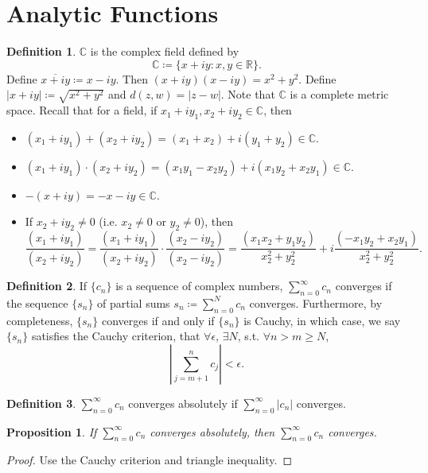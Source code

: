 \documentclass[12pt]{article}
\theoremstyle{plain}
\newtheorem*{prop}{Proposition}
\theoremstyle{definition}
\newtheorem*{defn}{Definition}
\begin{document}
\section*{Analytic Functions}
\begin{defn}
    $\mathbb{C}$ is the complex field defined by
    $$\mathbb{C}\coloneqq\{x+iy:x,y\in\mathbb{R}\}.$$
    Define $\overline{x+iy}\coloneqq x-iy$.
    Then $(x+iy)(x-iy) = x^2+y^2$.
    Define $|x+iy|\coloneqq \sqrt{x^2+y^2}$
    and $d(z,w)=|z-w|$.
    Note that $\mathbb{C}$ is a complete metric space.
    Recall that for a field, if $x_1+iy_1,x_2+iy_2\in\mathbb{C}$, then
    \begin{itemize}
        \item $(x_1+iy_1)+(x_2+iy_2) = (x_1+x_2) + i(y_1+y_2)\in\mathbb{C}$.
        \item $(x_1+iy_1)\cdot(x_2+iy_2) =
        (x_1y_1-x_2y_2)+i(x_1y_2+x_2y_1)\in\mathbb{C}$.
        \item $-(x+iy) = -x-iy\in\mathbb{C}$.
        \item If $x_2+iy_2\neq 0$ (i.e. $x_2\neq 0$ or $y_2\neq 0$), then
        \[
                \frac{(x_1+iy_1)}{(x_2+iy_2)} =
                \frac{(x_1+iy_1)}{(x_2+iy_2)}\cdot\frac{(x_2-iy_2)}{(x_2-iy_2)}
                =\frac{(x_1x_2+y_1y_2)}{x_2^2+y_2^2}+i\frac{(-x_1y_2+x_2y_1)}{x_2^2+y_2^2}.
        \]
    \end{itemize}
\end{defn}
\begin{defn}
    If $\{c_n\}$ is a sequence of complex numbers, $\sum_{n=0}^\infty c_n$
    converges if the sequence $\{s_n\}$ of partial sums
    $s_n\coloneqq\sum_{n=0}^N c_n$ converges.
    Furthermore, by completeness, $\{s_n\}$ converges if and only if $\{s_n\}$
    is Cauchy, in which case, we say $\{s_n\}$ satisfies the Cauchy criterion,
    that $\forall \epsilon$, $\exists N$, s.t. $\forall n>m\geq N$,
    $$\left|\sum_{j=m+1}^n c_j\right|<\epsilon.$$
\end{defn}

\begin{defn}
    $\sum_{n=0}^\infty c_n$ converges absolutely if $\sum_{n=0}^\infty |c_n|$
    converges.
\end{defn}

\begin{prop}
    If $\sum_{n=0}^\infty c_n$ converges absolutely, then $\sum_{n=0}^\infty
    c_n$ converges.
\end{prop}
\begin{proof}
    Use the Cauchy criterion and triangle inequality.
\end{proof}
\end{document}
